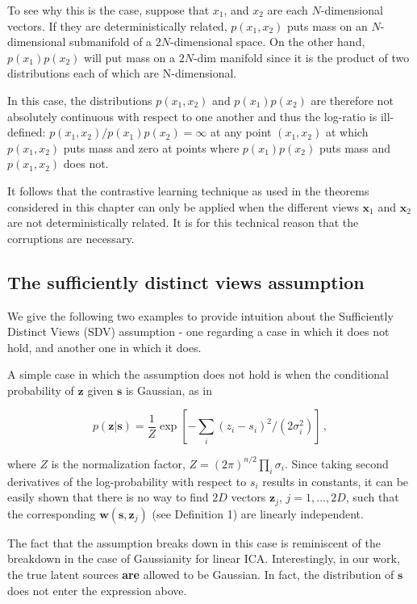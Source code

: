 To see why this is the case, suppose that $x_1$, and $x_2$ are each $N$-dimensional vectors.
If they are deterministically related, $p(x_1, x_2)$ puts mass on an $N$-dimensional submanifold of a $2N$-dimensional space.
On the other hand, $p(x_1)p(x_2)$ will put mass on a $2N$-dim manifold since it is the product of two distributions each of which are N-dimensional.

In this case, the distributions $p(x_1, x_2)$ and $p(x_1)p(x_2)$ are therefore not absolutely continuous with respect to one another and thus the log-ratio is ill-defined: $p(x_1, x_2)/p(x_1)p(x_2) = \infty$ at any point $(x_1,x_2)$ at which $p(x_1, x_2)$ puts mass and zero at points where $p(x_1)p(x_2)$ puts mass and $p(x_1,x_2)$ does not.

It follows that the contrastive learning technique as used in the theorems considered in this chapter can only be applied when the different views $\bm{x}_1$ and $\bm{x}_2$ are not deterministically related.
It is for this technical reason that the corruptions are necessary.


\subsection{The sufficiently distinct views assumption}
\label{appendix:sdv}

We give the following two examples to provide intuition about the Sufficiently Distinct Views (SDV) assumption - one regarding a case in which it does not hold, and another one in which it does.


A simple case in which the assumption does not hold is when the conditional probability of $\bm{z}$ given $\bm{s}$ is Gaussian, as in

\begin{equation}
p(\bm{z}|\bm{s}) = \frac{1}{Z} \exp\left[ -\sum_i (z_i - s_i)^2/(2\sigma_i^2) \right]\,, \label{eq:unsatisfied}
\end{equation}

where $Z$ is the normalization factor, $Z = (2\pi)^{n/2}  \prod_i \sigma_i$.
Since taking second derivatives of the log-probability with respect to $s_i$ results in constants,
it can be easily shown that there is no way to find $2D$ vectors $\bm{z}_j$, $j=1, \ldots, 2D$, such that the corresponding $\bm{w}(\bm{s}, \bm{z}_j)$ (see Definition 1) are linearly independent.


The fact that the assumption breaks down in this case is reminiscent of the breakdown in the case of Gaussianity for linear ICA. Interestingly, in our work, the true latent sources \textbf{are} allowed to be Gaussian. In fact, the distribution of $\bm{s}$ does not enter the expression above.


